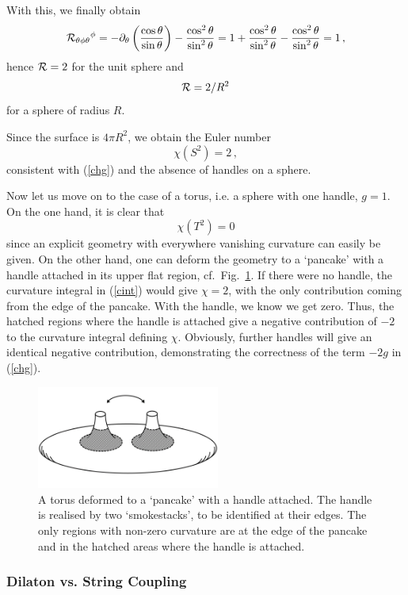 \documentclass[12pt]{article}
\newcommand{\be}{\begin{equation}}
\newcommand{\ee}{\end{equation}}
\numberwithin{equation}{section}
\begin{document}
With this, we finally obtain
\be
{\cal R}_{\theta\phi\theta}{}^\phi=-\partial_\theta\left( \frac{\cos\theta}{\sin\theta}\right)-\frac{\cos^2\theta}{\sin^2\theta}=
1+\frac{\cos^2\theta}{\sin^2\theta}-\frac{\cos^2\theta}{\sin^2\theta}=1\,,
\ee
hence ${\cal R}=2$ for the unit sphere and
\be
{\cal R}=2/R^2
\ee
for a sphere of radius $R$.

Since the surface is $4\pi R^2$, we obtain the Euler number
\be
\chi(S^2)=2\,,
\ee
consistent with (\ref{chg}) and the absence of handles on a sphere.

Now let us move on to the case of a torus, i.e. a sphere with one handle, $g=1$. On the one hand, it is clear that
\be
\chi(T^2)=0
\ee
since an explicit geometry with everywhere vanishing curvature can easily be given. On the other hand, one can deform the geometry to a `pancake' with a handle attached in its upper flat region, cf.~Fig.~\ref{pancake}. If there were no handle, the curvature integral in (\ref{cint}) would give $\chi=2$, with the only contribution coming from the edge of the pancake. With the handle, we know we get zero. Thus, the hatched regions where the handle is attached give a negative contribution of $-2$ to the curvature integral defining $\chi$. Obviously, further handles will give an identical negative contribution, demonstrating the correctness of the term $-2g$ in (\ref{chg}). 

\begin{figure}[ht]
\begin{center} 
\includegraphics[width=6cm]{pancake.png}
\caption{
A torus deformed to a `pancake' with a handle attached. The handle is realised by two `smokestacks', to be identified at their edges. The only regions with non-zero curvature are at the edge of the pancake and in the hatched areas where the handle is attached. 
}
\label{pancake} 
\end{center}
\end{figure}






\subsubsection{Dilaton vs. String Coupling}
\end{document}
